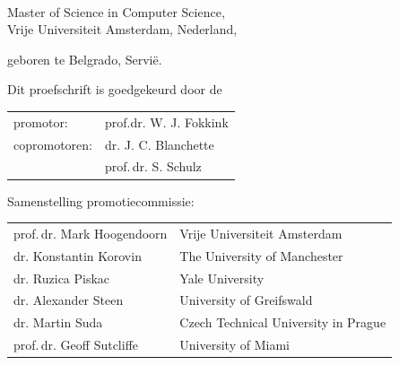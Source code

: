 \begin{titlepage}
\begin{center}
\makeatletter
{\Large\titlefont\bfseries\@firstname\ \titleshape{\MakeUppercase{\@lastname}}}
\makeatother

\bigskip
\bigskip

Master of Science in Computer Science, \\
Vrije Universiteit Amsterdam, Nederland,

geboren te Belgrado, Servi\"e.

\vspace*{2\bigskipamount}

\end{center}

\clearpage
\thispagestyle{empty}

\noindent Dit proefschrift is goedgekeurd door de

\medskip\noindent
\begin{tabular}{ll}
    promotor: & prof.dr. W. J. Fokkink \\
    copromotoren: & dr. J. C. Blanchette \\
                  & prof.$\,$dr. S. Schulz
\end{tabular}

\bigskip
\noindent Samenstelling promotiecommissie:

\medskip\noindent
\begin{tabular}{p{4.5cm}l}

prof.$\,$dr. Mark Hoogendoorn & Vrije Universiteit Amsterdam \\
dr. Konstantin Korovin & The University of Manchester \\
dr. Ruzica Piskac & Yale University \\
dr. Alexander Steen & University of Greifswald \\
dr. Martin Suda & Czech Technical University in Prague \\
prof.$\,$dr. Geoff Sutcliffe & University of Miami \\

\end{tabular}



\end{titlepage}
